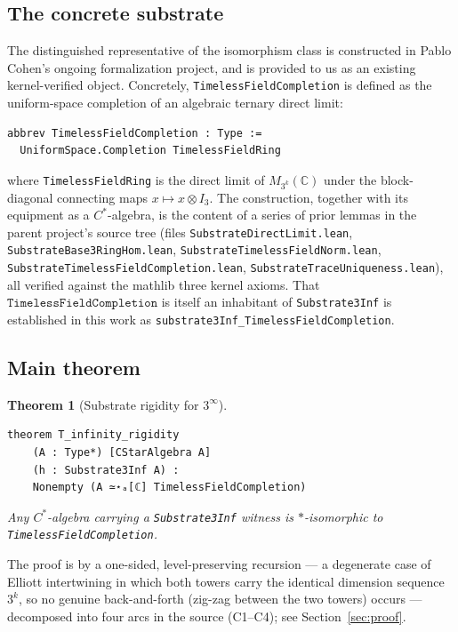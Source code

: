 \documentclass[11pt,a4paper]{article}
\theoremstyle{plain}
\newtheorem{theorem}{Theorem}[section]
\theoremstyle{definition}
\begin{document}
\subsection{The concrete substrate}

The distinguished representative of the isomorphism class is constructed in Pablo Cohen's ongoing formalization project, and is provided to us as an existing kernel-verified object. Concretely, \texttt{TimelessFieldCompletion} is defined as the uniform-space completion of an algebraic ternary direct limit:

\begin{lstlisting}
abbrev TimelessFieldCompletion : Type :=
  UniformSpace.Completion TimelessFieldRing
\end{lstlisting}

\noindent
where \texttt{TimelessFieldRing} is the direct limit of $M_{3^k}(\mathbb{C})$ under the block-diagonal connecting maps $x \mapsto x \otimes I_3$. The construction, together with its equipment as a $C^{\ast}$-algebra, is the content of a series of prior lemmas in the parent project's source tree (files \texttt{SubstrateDirectLimit.lean}, \texttt{SubstrateBase3RingHom.lean}, \texttt{SubstrateTimelessFieldNorm.lean}, \texttt{SubstrateTimelessFieldCompletion.lean}, \texttt{SubstrateTraceUniqueness.lean}), all verified against the mathlib three kernel axioms. That $\texttt{TimelessFieldCompletion}$ is itself an inhabitant of \texttt{Substrate3Inf} is established in this work as \texttt{substrate3Inf\_TimelessFieldCompletion}.

\subsection{Main theorem}

\begin{theorem}[Substrate rigidity for $3^{\infty}$]
\label{thm:main}
\begin{lstlisting}
theorem T_infinity_rigidity
    (A : Type*) [CStarAlgebra A]
    (h : Substrate3Inf A) :
    Nonempty (A ≃⋆ₐ[ℂ] TimelessFieldCompletion)
\end{lstlisting}
\emph{Any $C^{\ast}$-algebra carrying a \texttt{Substrate3Inf} witness is $\ast$-isomorphic to \texttt{TimelessFieldCompletion}.}
\end{theorem}

The proof is by a one-sided, level-preserving recursion --- a degenerate case of Elliott intertwining in which both towers carry the identical dimension sequence $3^k$, so no genuine back-and-forth (zig-zag between the two towers) occurs --- decomposed into four arcs in the source (C1--C4); see Section~\ref{sec:proof}.
\end{document}
